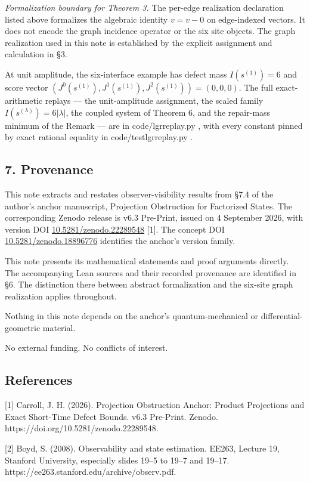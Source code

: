 \documentclass[
  11pt,
]{article}
\theoremstyle{plain}
\theoremstyle{definition}\newtheorem{definition}[theorem]{Definition}
\theoremstyle{remark}\newtheorem*{remark}{Remark}
\DeclareRobustCommand{\texttt}[1]{%
  \ifmmode
    \mathtt{#1}%
  \else
    {\ttfamily\small\renewcommand{\_}{\symbol{95}\allowbreak}#1}%
  \fi}
\begin{document}
\emph{Formalization boundary for Theorem 3.} The per-edge realization
declaration listed above formalizes the algebraic identity \(v=v-0\) on
edge-indexed vectors. It does not encode the graph incidence operator or
the six site objects. The graph realization used in this note is
established by the explicit assignment and calculation in §3.

At unit amplitude, the six-interface example has defect mass
\(I(s^{(1)})=6\) and score vector
\((J^0(s^{(1)}), J^1(s^{(1)}), J^2(s^{(1)})) = (0, 0, 0)\). The full
exact-arithmetic replays --- the unit-amplitude assignment, the scaled
family \(I(s^{(\lambda)})=6\lvert\lambda\rvert\), the coupled system of
Theorem 6, and the repair-mass minimum of the Remark --- are in
\texttt{code/lgr\_replay.py}, with every constant pinned by exact
rational equality in \texttt{code/test\_lgr\_replay.py}.

\subsection{7. Provenance}\label{provenance}

This note extracts and restates observer-visibility results from §7.4 of
the author's anchor manuscript, Projection Obstruction for Factorized
States. The corresponding Zenodo release is v6.3 Pre-Print, issued on 4
September 2026, with version DOI
\href{https://doi.org/10.5281/zenodo.22289548}{10.5281/zenodo.22289548}
{[}1{]}. The concept DOI
\href{https://doi.org/10.5281/zenodo.18896776}{10.5281/zenodo.18896776}
identifies the anchor's version family.

This note presents its mathematical statements and proof arguments
directly. The accompanying Lean sources and their recorded provenance
are identified in §6. The distinction there between abstract
formalization and the six-site graph realization applies throughout.

Nothing in this note depends on the anchor's quantum-mechanical or
differential-geometric material.

No external funding. No conflicts of interest.

\subsection{References}\label{references}

{[}1{]} Carroll, J. H. (2026). Projection Obstruction Anchor: Product
Projections and Exact Short-Time Defect Bounds. v6.3 Pre-Print. Zenodo.
https://doi.org/10.5281/zenodo.22289548.

{[}2{]} Boyd, S. (2008). Observability and state estimation. EE263,
Lecture 19, Stanford University, especially slides 19--5 to 19--7 and
19--17. https://ee263.stanford.edu/archive/observ.pdf.
\end{document}
